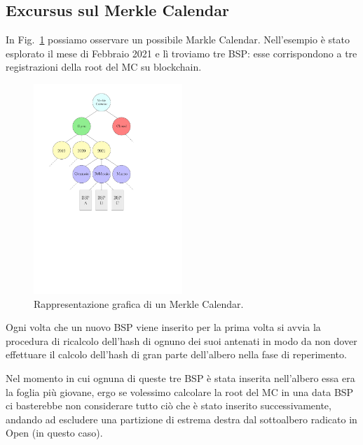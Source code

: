 \subsection{Excursus sul Merkle Calendar}

In Fig.~\ref{fi:mcIPE} possiamo osservare un possibile Markle Calendar.
Nell'esempio è stato esplorato il mese di Febbraio 2021 e lì troviamo tre BSP:
esse corrispondono a tre registrazioni della root del MC su blockchain.

\begin{figure}[H]
    \centering
    \includegraphics[width=0.5\textwidth]{Figures/mc1}
    \caption{\small{
    Rappresentazione grafica di un Merkle Calendar.
    } %
    } %
    \label{fi:mcIPE}
\end{figure}

Ogni volta che un nuovo BSP viene inserito per la prima volta si avvia la procedura di
ricalcolo dell'hash di ognuno dei suoi antenati in modo da non dover effettuare il calcolo
dell'hash di gran parte dell'albero nella fase di reperimento.

Nel momento in cui ognuna di queste tre BSP è stata inserita nell'albero essa era la foglia più
giovane, ergo se volessimo calcolare la root del MC in una data BSP ci basterebbe non
considerare tutto ciò che è stato inserito successivamente, andando ad escludere una
partizione di estrema destra dal sottoalbero radicato in Open (in questo caso).

\newpage


